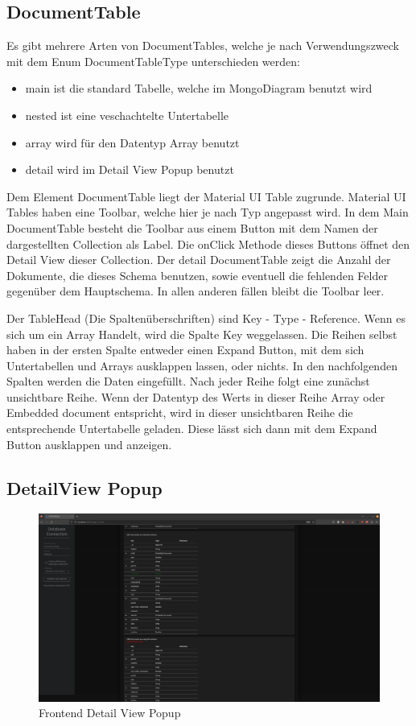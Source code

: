 \subsection{DocumentTable}
\label{sub:fe_document_table}

Es gibt mehrere Arten von DocumentTables, welche je nach Verwendungszweck mit dem Enum DocumentTableType unterschieden werden:
\begin{itemize}
    \item main ist die standard Tabelle, welche im MongoDiagram benutzt wird
    \item nested ist eine veschachtelte Untertabelle
    \item array wird für den Datentyp Array benutzt
    \item detail wird im Detail View Popup benutzt
\end{itemize}

Dem Element DocumentTable liegt der Material UI Table zugrunde.
Material UI Tables haben eine Toolbar, welche hier je nach Typ angepasst wird.
In dem Main DocumentTable besteht die Toolbar aus einem Button mit dem Namen der dargestellten Collection als Label.
Die onClick Methode dieses Buttons öffnet den Detail View dieser Collection.
Der detail DocumentTable zeigt die Anzahl der Dokumente, die dieses Schema benutzen, sowie eventuell die fehlenden Felder gegenüber dem Hauptschema.
In allen anderen fällen bleibt die Toolbar leer.

Der TableHead (Die Spaltenüberschriften) sind Key - Type - Reference.
Wenn es sich um ein Array Handelt, wird die Spalte Key weggelassen.
Die Reihen selbst haben in der ersten Spalte entweder einen Expand Button, mit dem sich Untertabellen und Arrays ausklappen lassen, oder nichts.
In den nachfolgenden Spalten werden die Daten eingefüllt.
Nach jeder Reihe folgt eine zunächst unsichtbare Reihe.
Wenn der Datentyp des Werts in dieser Reihe Array oder Embedded document entspricht, wird in dieser unsichtbaren Reihe die entsprechende Untertabelle geladen.
Diese lässt sich dann mit dem Expand Button ausklappen und anzeigen.


\subsection{DetailView Popup}
\label{sub:fe_detail_view}

\begin{figure}[H]
    \includegraphics[width=\textwidth]{images/frontend_detail_view}
    \caption{Frontend Detail View Popup}
    \label{fig:frontend_detail_view}
\end{figure}

